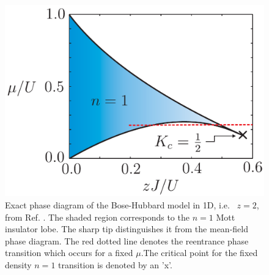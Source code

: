 \begin{figure}
  \centering
  \includegraphics[width=0.8\linewidth]{1DPhase}
  \caption[Exact 1D Bose-Hubbard Phase Diagram]{Exact phase diagram
    of the Bose-Hubbard model in 1D, i.e.~ $z = 2$, from
    Ref. \cite{StephenThesis}. The shaded region corresponds to the
    $n = 1$ Mott insulator lobe. The sharp tip distinguishes it from
    the mean-field phase diagram. The red dotted line denotes the
    reentrance phase transition which occurs for a fixed $\mu$.The
    critical point for the fixed density $n = 1$ transition is denoted
    by an 'x'. \label{fig:1DPhase}}
\end{figure}

